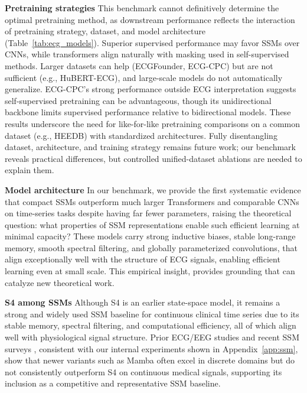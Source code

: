 \documentclass{article}
\newcommand{\heading}[1]{\noindent\textbf{#1}}
\begin{document}
    \heading{Pretraining strategies} This benchmark cannot definitively determine the optimal pretraining method, as downstream performance reflects the interaction of pretraining strategy, dataset, and model architecture (Table~\ref{tab:ecg_models}). Superior supervised performance may favor SSMs over CNNs, while transformers align naturally with masking used in self-supervised methods. Larger datasets can help (ECGFounder, ECG-CPC) but are not sufficient (e.g., HuBERT-ECG), and large-scale models do not automatically generalize. ECG-CPC’s strong performance outside ECG interpretation suggests self-supervised pretraining can be advantageous, though its unidirectional backbone limits supervised performance relative to bidirectional models. These results underscore the need for like-for-like pretraining comparisons on a common dataset (e.g., HEEDB) with standardized architectures. Fully disentangling dataset, architecture, and training strategy remains future work; our benchmark reveals practical differences, but controlled unified-dataset ablations are needed to explain them.
        
    \heading{Model architecture} 
    In our benchmark, we provide the first systematic evidence that compact SSMs outperform much larger Transformers and comparable CNNs on time-series tasks despite having far fewer parameters, raising the theoretical question: what properties of SSM representations enable such efficient learning at minimal capacity? These models carry strong inductive biases, stable long-range memory, smooth spectral filtering, and globally parameterized convolutions, that align exceptionally well with the structure of ECG signals, enabling efficient learning even at small scale. This empirical insight, provides grounding that can catalyze new theoretical work.
    
    \heading{S4 among SSMs}
    Although S4 is an earlier state-space model, it remains a strong and widely used SSM baseline for continuous clinical time series due to its stable memory, spectral filtering, and computational efficiency, all of which align well with physiological signal structure. Prior ECG/EEG studies \citep{mehari2023towards,wang2025s4sleep} and recent SSM surveys \citep{somvanshi2025s4,patro2024mamba}, consistent with our internal experiments shown in Appendix~\ref{app:ssm}, show that newer variants such as Mamba often excel in discrete domains but do not consistently outperform S4 on continuous medical signals, supporting its inclusion as a competitive and representative SSM baseline.
        
\end{document}
